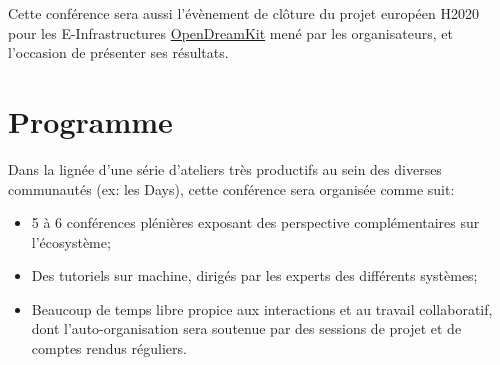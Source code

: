 \documentclass[12pt]{amsart}
\begin{document}
Cette conférence sera aussi l'évènement de clôture du projet européen H2020 pour les E-Infrastructures \href{opendreamkit.org}{OpenDreamKit} mené par les organisateurs, et l'occasion de présenter ses résultats.


\section*{Programme}
Dans la lignée d'une série d'ateliers très productifs au sein des diverses communautés (ex: les \Sage Days), cette conférence sera organisée comme suit:
\begin{itemize}
\item 5 à 6 conférences plénières exposant des perspective complémentaires sur l'écosystème;
\item Des tutoriels sur machine, dirigés par les experts des différents systèmes;
\item Beaucoup de temps libre propice aux interactions et au travail
  collaboratif, dont l'auto-organisation sera soutenue par des
  sessions de projet et de comptes rendus réguliers.
\end{itemize}
\end{document}
